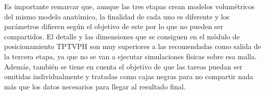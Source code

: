 


Es importante remarcar que, aunque las tres etapas crean modelos volumétricos del mismo modelo anatómico, la finalidad de cada uno es diferente y los parámetros difieren según el objetivo de este por lo que no pueden ser compartidos. El detalle y las dimensiones que se consiguen en el módulo de posicionamiento \ac{TPTVPH} son muy superiores a las recomendadas como salida de la tercera etapa, ya que no se van a ejecutar simulaciones físicas sobre esa malla. Además, también se tiene en cuenta el objetivo de que las tareas puedan ser omitidas individualmente y tratadas como cajas negras para no compartir nada más que los datos necesarios para llegar al resultado final.




